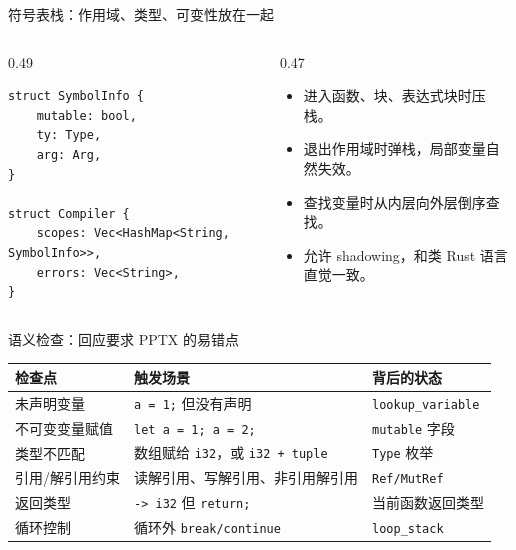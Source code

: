 \documentclass[aspectratio=169]{ctexbeamer}
\begin{document}
\begin{frame}[fragile]{符号表栈：作用域、类型、可变性放在一起}
    \begin{columns}[T]
    \begin{column}{0.49\textwidth}
        \begin{lstlisting}[style=tinycode]
struct SymbolInfo {
    mutable: bool,
    ty: Type,
    arg: Arg,
}

struct Compiler {
    scopes: Vec<HashMap<String, SymbolInfo>>,
    errors: Vec<String>,
}
        \end{lstlisting}
    \end{column}
    \begin{column}{0.47\textwidth}
        \begin{itemize}
            \item 进入函数、块、表达式块时压栈。
            \item 退出作用域时弹栈，局部变量自然失效。
            \item 查找变量时从内层向外层倒序查找。
            \item 允许 shadowing，和类 Rust 语言直觉一致。
        \end{itemize}
    \end{column}
    \end{columns}
\end{frame}

\begin{frame}{语义检查：回应要求 PPTX 的易错点}
    \begin{table}
    \centering
    \small
    \begin{tabular}{p{2.9cm}p{4.1cm}p{4.4cm}}
        \toprule
        \textbf{检查点} & \textbf{触发场景} & \textbf{背后的状态} \\
        \midrule
        未声明变量 & \texttt{a = 1;} 但没有声明 & \texttt{lookup\_variable} \\
        不可变变量赋值 & \texttt{let a = 1; a = 2;} & \texttt{mutable} 字段 \\
        类型不匹配 & 数组赋给 \texttt{i32}，或 \texttt{i32 + tuple} & \texttt{Type} 枚举 \\
        引用/解引用约束 & 读解引用、写解引用、非引用解引用 & \texttt{Ref/MutRef} \\
        返回类型 & \texttt{-> i32} 但 \texttt{return;} & 当前函数返回类型 \\
        循环控制 & 循环外 \texttt{break/continue} & \texttt{loop\_stack} \\
        \bottomrule
    \end{tabular}
    \end{table}
\end{frame}
\end{document}
